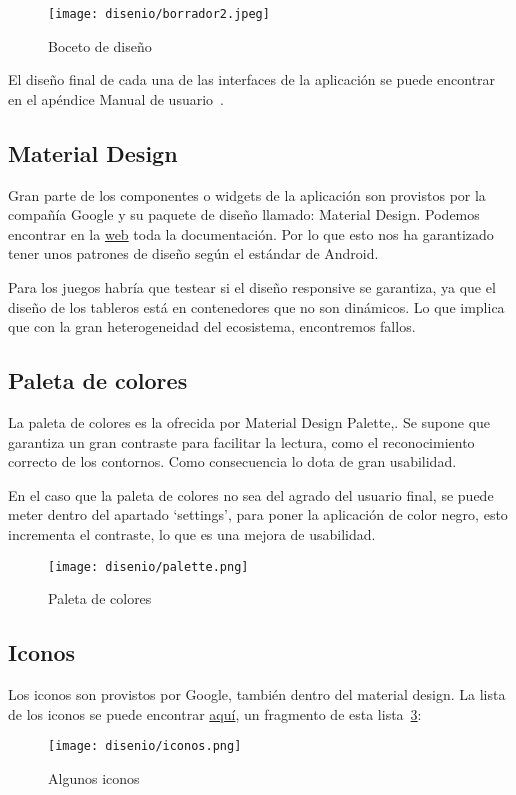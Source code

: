 \begin{figure}[H]
	\centering
	\texttt{[image: disenio/borrador2.jpeg]}
	\caption{Boceto de diseño}\label{fig:borrador}
\end{figure}

El diseño final de cada una de las interfaces de la aplicación se puede encontrar en el apéndice Manual de usuario~\pageref{manualusuario}.

\subsection{Material Design}
Gran parte de los componentes o widgets de la aplicación son provistos por la compañía Google y su paquete de diseño llamado: Material Design. Podemos encontrar en la \href{https://material.io/develop/flutter}{web} toda la documentación. Por lo que esto nos ha garantizado tener unos patrones de diseño según el estándar de Android. 

Para los juegos habría que testear si el diseño responsive se garantiza, ya que el diseño de los tableros está en contenedores que no son dinámicos. Lo que implica que con la gran heterogeneidad del ecosistema, encontremos fallos.

\subsection{Paleta de colores}
La paleta de colores es la ofrecida por Material Design Palette,. Se supone que garantiza un gran contraste para facilitar la lectura, como el reconocimiento correcto de los contornos. Como consecuencia lo dota de gran usabilidad.

En el caso que la paleta de colores no sea del agrado del usuario final, se puede meter dentro del apartado `settings', para poner la aplicación de color negro, esto incrementa el contraste, lo que es una mejora de usabilidad.

\begin{figure}[H]
	\centering
	\texttt{[image: disenio/palette.png]}
	\caption{Paleta de colores}\label{fig:palette}
\end{figure}

\subsection{Iconos}
Los iconos son provistos por Google, también dentro del material design. La lista de los iconos se puede encontrar \href{https://material.io/resources/icons/?style=sharp}{aquí}, un fragmento de esta lista~\ref{fig:iconos}:

\begin{figure}[H]
	\centering
	\texttt{[image: disenio/iconos.png]}
	\caption{Algunos iconos}\label{fig:iconos}
\end{figure}


